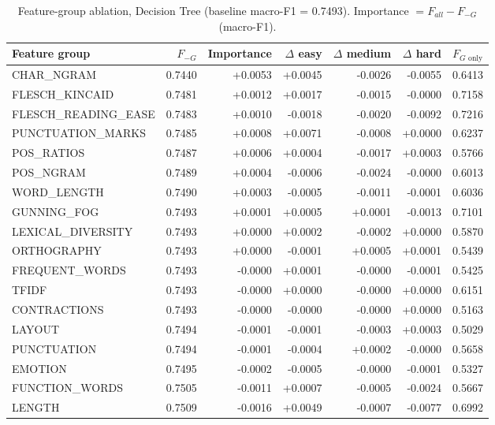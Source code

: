 
\begin{table}[ht]
\centering
\small
\caption{Feature-group ablation, Decision Tree (baseline macro-F1 = 0.7493). Importance $= F_{all} - F_{-G}$ (macro-F1).}
\label{tab:ablation-features-tree}
\begin{tabular}{lrrrrrr}
\toprule
Feature group & $F_{-G}$ & Importance & $\Delta$ easy & $\Delta$ medium & $\Delta$ hard & $F_{G\text{ only}}$ \\
\midrule
CHAR\_NGRAM & 0.7440 & +0.0053 & +0.0045 & -0.0026 & -0.0055 & 0.6413 \\
FLESCH\_KINCAID & 0.7481 & +0.0012 & +0.0017 & -0.0015 & -0.0000 & 0.7158 \\
FLESCH\_READING\_EASE & 0.7483 & +0.0010 & -0.0018 & -0.0020 & -0.0092 & 0.7216 \\
PUNCTUATION\_MARKS & 0.7485 & +0.0008 & +0.0071 & -0.0008 & +0.0000 & 0.6237 \\
POS\_RATIOS & 0.7487 & +0.0006 & +0.0004 & -0.0017 & +0.0003 & 0.5766 \\
POS\_NGRAM & 0.7489 & +0.0004 & -0.0006 & -0.0024 & -0.0000 & 0.6013 \\
WORD\_LENGTH & 0.7490 & +0.0003 & -0.0005 & -0.0011 & -0.0001 & 0.6036 \\
GUNNING\_FOG & 0.7493 & +0.0001 & +0.0005 & +0.0001 & -0.0013 & 0.7101 \\
LEXICAL\_DIVERSITY & 0.7493 & +0.0000 & +0.0002 & -0.0002 & +0.0000 & 0.5870 \\
ORTHOGRAPHY & 0.7493 & +0.0000 & -0.0001 & +0.0005 & +0.0001 & 0.5439 \\
FREQUENT\_WORDS & 0.7493 & -0.0000 & +0.0001 & -0.0000 & -0.0001 & 0.5425 \\
TFIDF & 0.7493 & -0.0000 & +0.0000 & -0.0000 & +0.0000 & 0.6151 \\
CONTRACTIONS & 0.7493 & -0.0000 & -0.0000 & -0.0000 & +0.0000 & 0.5163 \\
LAYOUT & 0.7494 & -0.0001 & -0.0001 & -0.0003 & +0.0003 & 0.5029 \\
PUNCTUATION & 0.7494 & -0.0001 & -0.0004 & +0.0002 & -0.0000 & 0.5658 \\
EMOTION & 0.7495 & -0.0002 & -0.0005 & -0.0000 & -0.0001 & 0.5327 \\
FUNCTION\_WORDS & 0.7505 & -0.0011 & +0.0007 & -0.0005 & -0.0024 & 0.5667 \\
LENGTH & 0.7509 & -0.0016 & +0.0049 & -0.0007 & -0.0077 & 0.6992 \\
\bottomrule
\end{tabular}
\end{table}

